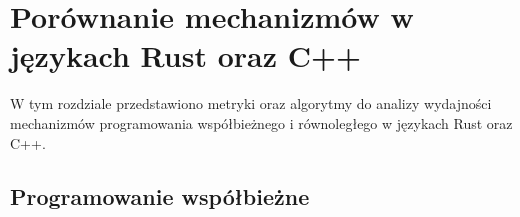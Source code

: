 





\chapter{Porównanie mechanizmów w językach Rust oraz C++}
W tym rozdziale przedstawiono metryki oraz algorytmy do analizy wydajności mechanizmów programowania współbieżnego i równoległego w językach Rust oraz C++. 
\section{Programowanie współbieżne}
